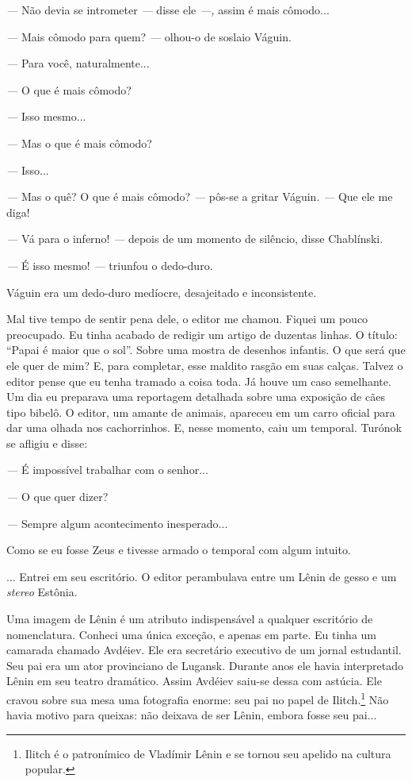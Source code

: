 \emph{---} Não devia se intrometer \emph{---} disse ele \emph{---,}
assim é mais cômodo...

\emph{---} Mais cômodo para quem? \emph{---} olhou-o de soslaio Váguin.

\emph{---} Para você, naturalmente...

\emph{---} O que é mais cômodo?

\emph{---} Isso mesmo...

\emph{---} Mas o que é mais cômodo?

\emph{---} Isso...

\emph{---} Mas o quê? O que é mais cômodo? \emph{---} pôs-se a gritar
Váguin. \emph{---} Que ele me diga!

\emph{---} Vá para o inferno! \emph{---} depois de um momento de
silêncio, disse Chablínski.

\emph{---} É isso mesmo! \emph{---} triunfou o dedo-duro.

Váguin era um dedo-duro medíocre, desajeitado e inconsistente.

Mal tive tempo de sentir pena dele, o editor me chamou. Fiquei um pouco
preocupado. Eu tinha acabado de redigir um artigo de duzentas linhas. O
título: ``Papai é maior que o sol''. Sobre uma mostra de desenhos
infantis. O que será que ele quer de mim? E, para completar, esse
maldito rasgão em suas calças. Talvez o editor pense que eu tenha
tramado a coisa toda. Já houve um caso semelhante. Um dia eu preparava
uma reportagem detalhada sobre uma exposição de cães tipo bibelô. O
editor, um amante de animais, apareceu em um carro oficial para dar uma
olhada nos cachorrinhos. E, nesse momento, caiu um temporal. Turónok se
afligiu e disse:

\emph{---} É impossível trabalhar com o senhor...

\emph{---} O que quer dizer?

\emph{---} Sempre algum acontecimento inesperado...

Como se eu fosse Zeus e tivesse armado o temporal com algum intuito.

... Entrei em seu escritório. O editor perambulava entre um Lênin de
gesso e um \emph{stereo} Estônia.

Uma imagem de Lênin é um atributo indispensável a qualquer escritório de
nomenclatura. Conheci uma única exceção, e apenas em parte. Eu tinha um
camarada chamado Avdéiev. Ele era secretário executivo de um jornal
estudantil. Seu pai era um ator provinciano de Lugansk. Durante anos ele
havia interpretado Lênin em seu teatro dramático. Assim Avdéiev saiu-se
dessa com astúcia. Ele cravou sobre sua mesa uma fotografia enorme: seu
pai no papel de Ilitch.\footnote{Ilitch é o patronímico de Vladímir
  Lênin e se tornou seu apelido na cultura popular.} Não havia motivo
para queixas: não deixava de ser Lênin, embora fosse seu pai...

